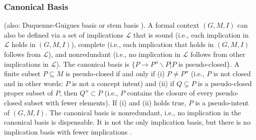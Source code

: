 \subsubsection{Canonical Basis}
(also: Duquenne-Guigues basis or stem basis \cite{ganter_conceptual_2016}).
A formal context $(G, M, I)$ can also be defined via a set of implications $\mathcal{L}$ that is sound (i.e., each implication in $\mathcal{L}$ holds in $(G, M, I)$), complete (i.e., each implication that holds in $(G, M, I)$ follows from $\mathcal{L}$), and nonredundant (i.e., no implication in $\mathcal{L}$ follows from other implications in $\mathcal{L}$).
The canonical basis is $\{P \rightarrow P'' \smallsetminus P | P$ is pseudo-closed$\}$.
A finite subset $P \subseteq M$ is pseudo-closed if and only if (i) $P \neq P''$ (i.e., $P$ is not closed and in other words: $P$ is not a concept intent) and (ii) if $Q \subsetneq P$ is a pseudo-closed proper subset of $P$, then $Q'' \subset P$ (i.e., $P$ contains the closure of every pseudo-closed subset with fewer elements).
If (i) and (ii) holds true, $P$ is a pseudo-intent of $(G, M, I)$.
The canonical basis is nonredundant, i.e., no implication in the canonical basis is dispensable.
It is not the only implication basis, but there is no implication basis with fewer implications \cite{ganter_conceptual_2016}.